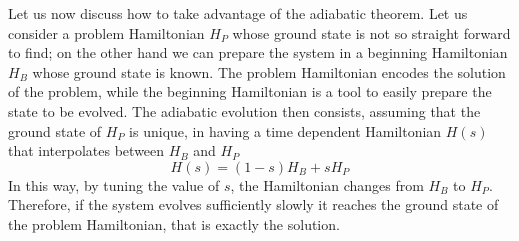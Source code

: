 \noindent
Let us now discuss how to take advantage of the adiabatic theorem. Let us consider a problem Hamiltonian $H_P$ whose ground state is not so straight forward to find; on the other hand we can prepare the system in a beginning Hamiltonian $H_B$ whose ground state is known. The problem Hamiltonian encodes the solution of the problem, while the beginning Hamiltonian is a tool to easily prepare the state to be evolved. The adiabatic evolution then consists, assuming that the ground state of $H_P$ is unique, in having a time dependent Hamiltonian $H(s)$ that interpolates between $H_B$ and $H_P$
    \begin{equation}
        H(s) = (1-s)H_B + s H_P
    \end{equation}
    In this way, by tuning the value of $s$, the Hamiltonian changes from $H_B$ to $H_P$. Therefore, if the system evolves sufficiently slowly it reaches the ground state of the problem Hamiltonian, that is exactly the solution.

